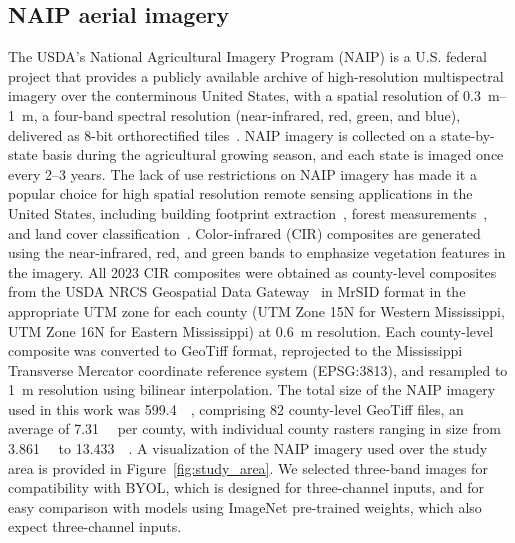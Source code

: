 \subsection{NAIP aerial imagery}\label{sec:data:naip}
The USDA's National Agricultural Imagery Program (NAIP) is a U.S. federal project that provides a publicly available archive of high-resolution multispectral imagery over the conterminous United States, with a spatial resolution of \SIrange{0.3}{1}{\meter}, a four-band spectral resolution (near-infrared, red, green, and blue), delivered as 8-bit orthorectified tiles~\citep{earthresourcesobservationandscienceeroscenterNationalAgricultureImagery2017}.
NAIP imagery is collected on a state-by-state basis during the agricultural growing season, and each state is imaged once every 2--3 years.
The lack of use restrictions on NAIP imagery has made it a popular choice for high spatial resolution remote sensing applications in the United States, including building footprint extraction~\citep{huangAerialImageryBasedBuilding2022}, forest measurements~\citep{hoglandMappingForestCharacteristics2018,daviesEstimatingJuniperCover2010}, and land cover classification~\citep{maxwellLandCoverClassification2017a, maxwellLargeAreaHighSpatial2019,hayesHighresolutionLandcoverClassification2014, martinsExploringMultiscaleObjectbased2020}.
Color-infrared (CIR) composites are generated using the near-infrared, red, and green bands to emphasize vegetation features in the imagery.
All 2023 CIR composites were obtained as county-level composites from the USDA NRCS Geospatial Data Gateway~\citep{usdaGeospatialDataGateway2016} in MrSID format in the appropriate UTM zone for each county (UTM Zone 15N for Western Mississippi, UTM Zone 16N for Eastern Mississippi) at \SI{0.6}{\meter} resolution.
Each county-level composite was converted to GeoTiff format, reprojected to the Mississippi Transverse Mercator coordinate reference system (EPSG:3813), and resampled to \SI{1}{\meter} resolution using bilinear interpolation.
The total size of the NAIP imagery used in this work was \SI[number-unit-product={\text{ }}]{599.4}{\giga \byte}, comprising 82 county-level GeoTiff files, an average of \SI[number-unit-product={\text{ }}]{7.31}{\giga \byte} per county, with individual county rasters ranging in size from \SI[number-unit-product={\text{ }}]{3.861}{\giga \byte} to \SI[number-unit-product={\text{ }}]{13.433}{\giga \byte}.
A visualization of the NAIP imagery used over the study area is provided in Figure~\ref{fig:study_area}.
We selected three-band images for compatibility with BYOL, which is designed for three-channel inputs, and for easy comparison with models using ImageNet pre-trained weights, which also expect three-channel inputs.

